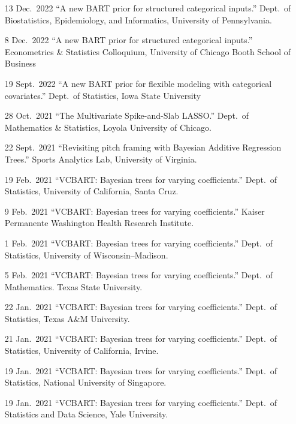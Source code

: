 \documentclass[margin]{res}
\begin{document}
\begin{resume}
\begin{itemize}
\item[13 Dec.~2022]{``A new BART prior for structured categorical inputs.'' Dept.~of Biostatistics, Epidemiology, and Informatics, University of Pennsylvania.}

\item[8 Dec.~2022]{``A new BART prior for structured categorical inputs.'' Econometrics \& Statistics Colloquium, University of Chicago Booth School of Business}

\item[19 Sept.~2022]{``A new BART prior for flexible modeling with categorical covariates.'' Dept.~of Statistics, Iowa State University}

\item[28 Oct.~2021]{``The Multivariate Spike-and-Slab LASSO.'' Dept.~of Mathematics \& Statistics, Loyola University of Chicago.}

\item[22 Sept.~2021]{``Revisiting pitch framing with Bayesian Additive Regression Trees.'' Sports Analytics Lab, University of Virginia.}

\item[19 Feb.~2021]{``VCBART: Bayesian trees for varying coefficients.'' Dept.~of Statistics, University of California, Santa Cruz.}

\item[9 Feb.~2021]{``VCBART: Bayesian trees for varying coefficients.'' Kaiser Permanente Washington Health Research Institute.}

\item[1 Feb.~2021]{``VCBART: Bayesian trees for varying coefficients.'' Dept.~of Statistics, University of Wisconsin--Madison.}

\item[5 Feb.~2021]{``VCBART: Bayesian trees for varying coefficients.'' Dept.~of Mathematics. Texas State University.}

\item[22 Jan.~2021]{``VCBART: Bayesian trees for varying coefficients.'' Dept.~of Statistics, Texas A\&M University.}

\item[21 Jan.~2021]{``VCBART: Bayesian trees for varying coefficients.'' Dept.~of Statistics, University of California, Irvine.}

\item[19 Jan.~2021]{``VCBART: Bayesian trees for varying coefficients.'' Dept.~of Statistics, National University of Singapore.}

\item[19 Jan.~2021]{``VCBART: Bayesian trees for varying coefficients.'' Dept.~of Statistics and Data Science, Yale University.}


\end{itemize}
\end{resume}
\end{document}
